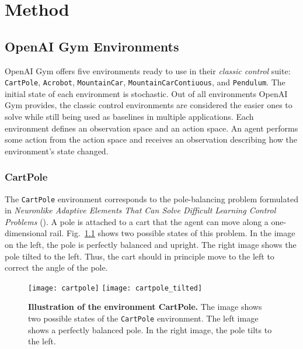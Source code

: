 
\chapter{Method}
\label{ch:method}

\section{OpenAI Gym Environments}
\label{sec:environments}
OpenAI Gym offers five environments ready to use in their \textit{classic control} suite: \verb|CartPole|, \texttt{Acrobot}, \verb|MountainCar|, \verb|MountainCarContiuous|, and \verb|Pendulum|. The initial state of each environment is stochastic. Out of all environments OpenAI Gym provides, the classic control environments are considered the easier ones to solve while still being used as baselines in multiple applications. Each environment defines an observation space and an action space. An agent performs some action from the action space and receives an observation describing how the environment's state changed.

\subsection{CartPole}
The \verb|CartPole| environment corresponds to the pole-balancing problem formulated in \emph{Neuronlike Adaptive Elements That Can Solve Difficult Learning Control Problems} (\cite{6313077}). A pole is attached to a cart that the agent can move along a one-dimensional rail. Fig.~\ref{fig:cartpole} shows two possible states of this problem. In the image on the left, the pole is perfectly balanced and upright. The right image shows the pole tilted to the left. Thus, the cart should in principle move to the left to correct the angle of the pole.
\begin{figure}[!ht]
  \centering
\texttt{[image: cartpole]} \hspace*{10mm} \texttt{[image: cartpole\_tilted]}
\caption[Illustration of the environment CartPole]{
  \textbf{Illustration of the environment CartPole.}
  The image shows two possible states of the \texttt{CartPole} environment. The left image shows a perfectly balanced pole. In the right image, the pole tilts to the left.
}
\label{fig:cartpole}
\end{figure}

